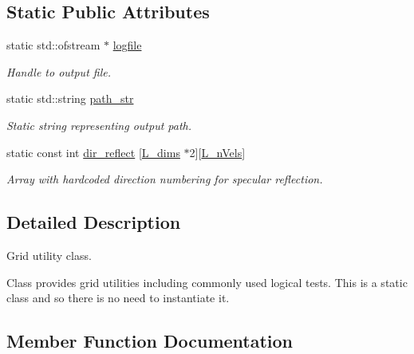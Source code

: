 \subsection*{Static Public Attributes}
\begin{DoxyCompactItemize}
\item 
static std\+::ofstream $\ast$ \hyperlink{class_grid_utils_a298239096e929c1ba4eba925e351c1b3}{logfile}
\begin{DoxyCompactList}\small\item\em Handle to output file. \end{DoxyCompactList}\item 
static std\+::string \hyperlink{class_grid_utils_a9b58748e9e05e84852962d7abc7942e3}{path\+\_\+str}
\begin{DoxyCompactList}\small\item\em Static string representing output path. \end{DoxyCompactList}\item 
static const int \hyperlink{class_grid_utils_a609ef43c9476067a52ee238cd3d594f2}{dir\+\_\+reflect} \mbox{[}\hyperlink{definitions_8h_a11cd469956bf6689c2bc034ee698e0b7}{L\+\_\+dims} $\ast$2\mbox{]}\mbox{[}\hyperlink{definitions_8h_a920e69a22e5f925675c5c77c521d586d}{L\+\_\+n\+Vels}\mbox{]}
\begin{DoxyCompactList}\small\item\em Array with hardcoded direction numbering for specular reflection. \end{DoxyCompactList}\end{DoxyCompactItemize}


\subsection{Detailed Description}
Grid utility class. 

Class provides grid utilities including commonly used logical tests. This is a static class and so there is no need to instantiate it. 

\subsection{Member Function Documentation}
